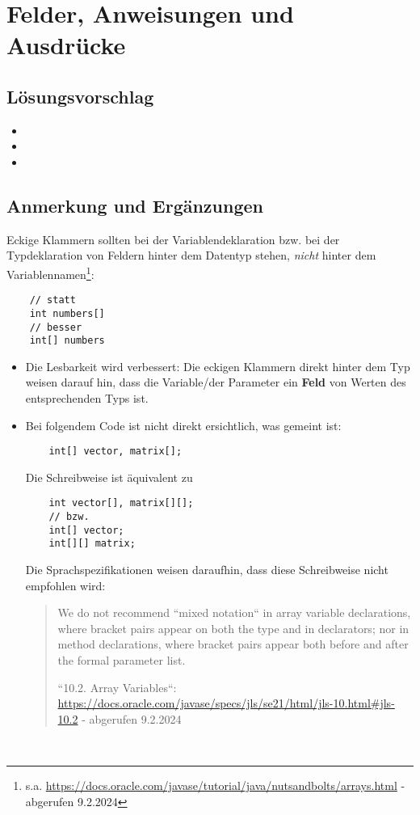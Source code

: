 \chapter{Felder, Anweisungen und Ausdrücke}

\section{Lösungsvorschlag}

\begin{itemize}
    \item {}
    \item {}
    \item {}
\end{itemize}

\section{Anmerkung und Ergänzungen}

Eckige Klammern sollten bei der Variablendeklaration {bzw.} bei der Typdeklaration von Feldern hinter dem Datentyp stehen, \textit{nicht} hinter dem Variablennamen\footnote{
    s.a. \url{https://docs.oracle.com/javase/tutorial/java/nutsandbolts/arrays.html} - abgerufen 9.2.2024}:

\begin{verbatim}
    // statt
    int numbers[]
    // besser
    int[] numbers
\end{verbatim}

\begin{itemize}
    \item Die Lesbarkeit wird verbessert: Die eckigen Klammern direkt hinter dem Typ weisen darauf hin, dass die Variable/der Parameter ein \textbf{Feld} von Werten des entsprechenden Typs ist.
    \item Bei folgendem Code ist nicht direkt ersichtlich, was gemeint ist:
    \begin{verbatim}
    int[] vector, matrix[];
    \end{verbatim}
    Die Schreibweise ist äquivalent zu
    \begin{verbatim}
    int vector[], matrix[][];
    // bzw.
    int[] vector;
    int[][] matrix;
    \end{verbatim}
    Die Sprachspezifikationen weisen daraufhin, dass diese Schreibweise nicht empfohlen wird:
    \blockquote[{``10.2. Array Variables``: \url{https://docs.oracle.com/javase/specs/jls/se21/html/jls-10.html#jls-10.2} - abgerufen 9.2.2024}]{
        We do not recommend ``mixed notation`` in array variable declarations, where bracket pairs appear on both the type and in declarators; nor in method declarations, where bracket pairs appear both before and after the formal parameter list.
    }
\end{itemize}\\

